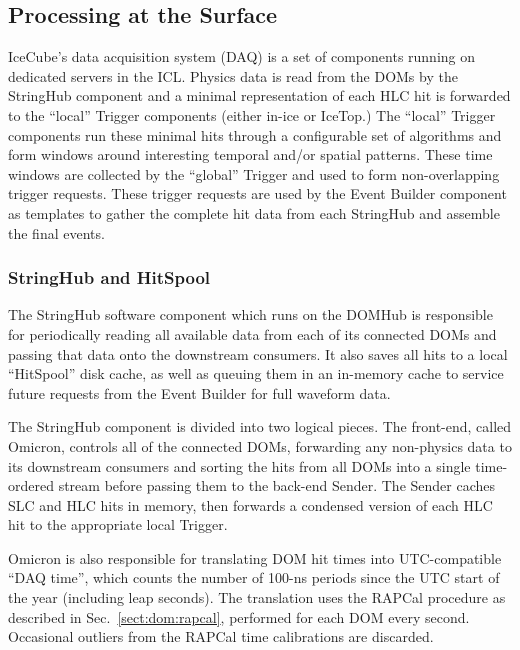 \subsection{Processing at the Surface}

IceCube's data acquisition system (DAQ) is a set of components running on
dedicated servers in the ICL.  Physics data is read from the DOMs by the StringHub
component and a minimal representation of each HLC hit is forwarded to the
``local'' Trigger components (either in-ice or IceTop.)
The ``local'' Trigger components run these
minimal hits through a configurable set of algorithms and form windows around
interesting temporal and/or spatial patterns.  These time windows are collected
by the ``global'' Trigger and used to form non-overlapping trigger requests.
These trigger requests are used by the Event Builder component as templates to
gather the complete hit data from each StringHub and assemble the final events.

\subsubsection{StringHub and HitSpool}
\label{sec:domhub_hitspool}

The StringHub software component which runs on the DOMHub is responsible for periodically reading all available data
from each of its connected DOMs and passing that data onto the downstream
consumers.  It also saves all hits to a local ``HitSpool'' disk cache, as
well as queuing them in an in-memory cache to service future requests from
the Event Builder for full waveform data.

The StringHub component is divided into two logical pieces.  The
front-end, called
Omicron, controls all of the connected DOMs, forwarding any
non-physics data to its downstream consumers and sorting the hits from all
DOMs into a single time-ordered stream
before passing them to the back-end Sender.  The Sender
caches SLC and HLC hits in memory, then forwards a condensed version of
each HLC hit to the appropriate local Trigger.

Omicron is also responsible for translating DOM hit times into
UTC-compatible ``DAQ time'', which counts the number of 100-ns periods
since the UTC start of the year (including leap seconds).  The translation
uses the RAPCal procedure as described in Sec.~\ref{sect:dom:rapcal},
performed for each DOM every second. Occasional outliers from the RAPCal time
calibrations are discarded.

